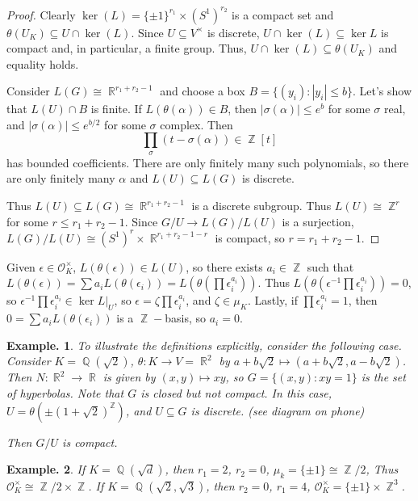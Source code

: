 \documentclass[11pt, a4paper]{memoir}
\DeclareMathOperator{\Q}{{\mathbb{Q}}}
\DeclareMathOperator{\Z}{{\mathbb{Z}}}
\DeclareMathOperator{\R}{{\mathbb{R}}}
\theoremstyle{change}
\theoremstyle{plain}
\theoremstyle{nonumberplain}
\newtheorem{example}{Example.}
\newtheorem{proof}{Proof}
\numberwithin{equation}{section}
\begin{document}
\begin{proof}
    Clearly $\ker(L)=\{\pm 1\}^{r_1}\times (S^1)^{r_2}$ is a compact set and $\theta(U_K)\subseteq U\cap\ker(L)$.
    Since $U\subseteq V^\times$ is discrete, $U\cap\ker(L)\subseteq\ker L$ is compact and, in particular, a finite group.
    Thus, $U\cap \ker(L)\subseteq\theta(U_K)$ and equality holds.

    Consider $L(G)\cong\R^{r_1+r_2-1}$ and choose a box $B=\{(y_i):|y_i|\leq b\}$.
    Let's show that $L(U)\cap B$ is finite.
    If $L(\theta(\alpha))\in B$, then $|\sigma(\alpha)|\leq e^b$ for some $\sigma$ real, and $|\sigma(\alpha)|\leq e^{b/2}$ for some $\sigma$ complex.
    Then
    \begin{equation*}
        \prod_\sigma(t-\sigma(\alpha))\in\Z[t]
    \end{equation*}
    has bounded coefficients.
    There are only finitely many such polynomials, so there are only finitely many $\alpha$ and $L(U)\subseteq L(G)$ is discrete.

    Thus $L(U)\subseteq L(G)\cong\R^{r_1+r_2-1}$ is a discrete subgroup.
    Thus $L(U)\cong\Z^r$ for some $r\leq r_1+r_2-1$.
    Since $G/U\to L(G)/L(U)$ is a surjection, $L(G)/L(U)\cong (S^1)^r\times\R^{r_1+r_2-1-r}$ is compact, so $r=r_1+r_2-1$.
\end{proof}

Given $\epsilon\in\mathcal{O}_K^\times$, $L(\theta(\epsilon))\in L(U)$, so there exists $a_i\in\Z$ such that $L(\theta(\epsilon))=\sum a_iL(\theta(\epsilon_i))=L(\theta(\prod\epsilon_i^{a_i}))$.
Thus $L(\theta(\epsilon^{-1}\prod\epsilon_i^{a_i}))=0$, so $\epsilon^{-1}\prod\epsilon_i^{a_i}\in\ker L|_U$, so $\epsilon=\zeta\prod\epsilon_i^{a_i}$, and $\zeta\in\mu_K$.
Lastly, if $\prod\epsilon_i^{a_i}=1$, then $0=\sum a_iL(\theta(\epsilon_i))$ is a $\Z-$basis, so $a_i=0$.

\begin{example}
    To illustrate the definitions explicitly, consider the following case.
    Consider $K=\Q(\sqrt{2})$, $\theta:K\to V=\R^2$ by $a+b\sqrt{2}\mapsto(a+b\sqrt{2},a-b\sqrt{2})$.
    Then $N:\R^2\to\R$ is given by $(x,y)\mapsto xy$, so $G=\{(x,y):xy=1\}$ is the set of hyperbolas.
    Note that $G$ is closed but not compact.
    In this case, $U=\theta(\pm(1+\sqrt{2})^{\Z})$, and $U\subseteq G$ is discrete.
    (see diagram on phone)
    \begin{center}
        \begin{tikzpicture}
        \end{tikzpicture}
    \end{center}
    Then $G/U$ is compact.
\end{example}
\begin{example}
    If $K=\Q(\sqrt{d})$, then $r_1=2$, $r_2=0$, $\mu_k=\{\pm 1\}\cong\Z/2$, Thus $\mathcal{O}_K^\times\cong\Z/2\times\Z$.
    If $K=\Q(\sqrt{2},\sqrt{3})$, then $r_2=0$, $r_1=4$, $\mathcal{O}_K^\times=\{\pm 1\}\times\Z^3$.
\end{example}
\end{document}
